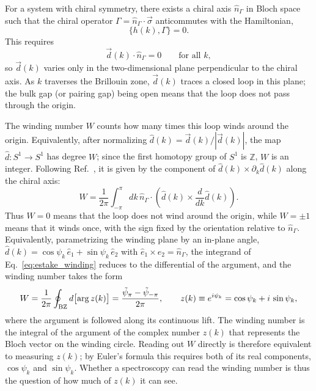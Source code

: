 \documentclass[onecolumn,aps,prl,superscriptaddress,longbibliography]{revtex4-2}
\begin{document}
For a system with chiral symmetry, there exists a chiral axis $\hat n_\Gamma$ in Bloch space such that the chiral operator $\Gamma=\hat n_\Gamma\cdot\vec{\sigma}$ anticommutes with the Hamiltonian,
\begin{equation}
  \{h(k),\Gamma\}=0.
\end{equation}
This requires
\begin{equation}
  \vec{d}(k)\cdot\hat n_\Gamma=0
  \qquad\text{for all }k,
\end{equation}
so $\vec{d}(k)$ varies only in the two-dimensional plane perpendicular to the chiral axis. As $k$ traverses the Brillouin zone, $\vec{d}(k)$ traces a closed loop in this plane; the bulk gap (or pairing gap) being open means that the loop does not pass through the origin.

The winding number $W$ counts how many times this loop winds around the origin. Equivalently, after normalizing $\hat{d}(k)=\vec{d}(k)/|\vec{d}(k)|$, the map $\hat{d}:S^1\to S^1$ has degree $W$; since the first homotopy group of $S^1$ is $\mathbb{Z}$, $W$ is an integer. Following Ref.~\cite{estakeRoy2025}, it is given by the component of $\hat{d}(k)\times\partial_k\hat{d}(k)$ along the chiral axis:
\begin{equation}\label{eq:estake_winding}
  W=\frac{1}{2\pi}\int_{-\pi}^{\pi} dk\,
  \hat n_\Gamma\cdot
  \left(\hat{d}(k)\times\frac{d}{dk}\hat{d}(k)\right).
\end{equation}
Thus $W=0$ means that the loop does not wind around the origin, while $W=\pm1$ means that it winds once, with the sign fixed by the orientation relative to $\hat n_\Gamma$. Equivalently, parametrizing the winding plane by an in-plane angle, $\hat{d}(k)=\cos\psi_k\,\hat e_1+\sin\psi_k\,\hat e_2$ with $\hat e_1\times\hat e_2=\hat n_\Gamma$, the integrand of Eq.~\eqref{eq:estake_winding} reduces to the differential of the argument, and the winding number takes the form
\begin{equation}\label{eq:winding_argument}
  W=\frac{1}{2\pi}\oint_{\rm BZ}d\bigl[\arg z(k)\bigr]
  =\frac{\tilde\psi_\pi-\tilde\psi_{-\pi}}{2\pi},
  \qquad
  z(k)\equiv e^{i\psi_k}=\cos\psi_k+i\,\sin\psi_k,
\end{equation}
where the argument is followed along its continuous lift. The winding number is the integral of the argument of the complex number $z(k)$ that represents the Bloch vector on the winding circle. Reading out $W$ directly is therefore equivalent to measuring $z(k)$; by Euler's formula this requires both of its real components, $\cos\psi_k$ and $\sin\psi_k$. Whether a spectroscopy can read the winding number is thus the question of how much of $z(k)$ it can see.
\end{document}

